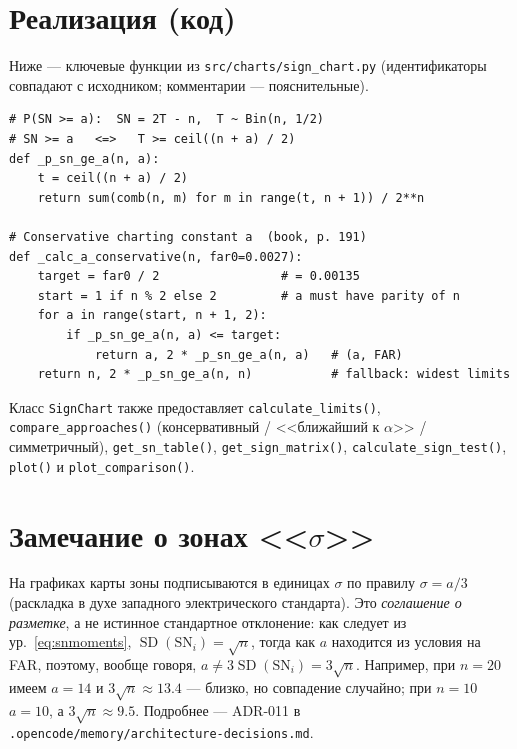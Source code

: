 \documentclass[11pt,a4paper]{article}
\newcommand{\SN}{\mathrm{SN}}
\begin{document}
\section{Реализация (код)}

Ниже --- ключевые функции из \texttt{src/charts/sign\_chart.py}
(идентификаторы совпадают с исходником; комментарии --- пояснительные).

\begin{lstlisting}
# P(SN >= a):  SN = 2T - n,  T ~ Bin(n, 1/2)
# SN >= a   <=>   T >= ceil((n + a) / 2)
def _p_sn_ge_a(n, a):
    t = ceil((n + a) / 2)
    return sum(comb(n, m) for m in range(t, n + 1)) / 2**n

# Conservative charting constant a  (book, p. 191)
def _calc_a_conservative(n, far0=0.0027):
    target = far0 / 2                 # = 0.00135
    start = 1 if n % 2 else 2         # a must have parity of n
    for a in range(start, n + 1, 2):
        if _p_sn_ge_a(n, a) <= target:
            return a, 2 * _p_sn_ge_a(n, a)   # (a, FAR)
    return n, 2 * _p_sn_ge_a(n, n)           # fallback: widest limits
\end{lstlisting}

Класс \texttt{SignChart} также предоставляет \texttt{calculate\_limits()},
\texttt{compare\_approaches()} (консервативный / <<ближайший к $\alpha$>> /
симметричный), \texttt{get\_sn\_table()}, \texttt{get\_sign\_matrix()},
\texttt{calculate\_sign\_test()}, \texttt{plot()} и
\texttt{plot\_comparison()}.

\section{Замечание о зонах <<$\sigma$>>}

На графиках карты зоны подписываются в единицах $\sigma$ по правилу
$\sigma=a/3$ (раскладка в духе западного электрического стандарта).
Это \emph{соглашение о разметке}, а не истинное стандартное отклонение:
как следует из ур.~\eqref{eq:snmoments},
$\operatorname{SD}(\SN_i)=\sqrt{n}$, тогда как $a$ находится из условия
на FAR, поэтому, вообще говоря, $a\ne 3\operatorname{SD}(\SN_i)=3\sqrt{n}$.
Например, при $n=20$ имеем $a=14$ и $3\sqrt{n}\approx 13.4$ --- близко,
но совпадение случайно; при $n=10$ $a=10$, а $3\sqrt{n}\approx 9.5$.
Подробнее --- ADR-011 в \texttt{.opencode/memory/architecture-decisions.md}.
\end{document}
